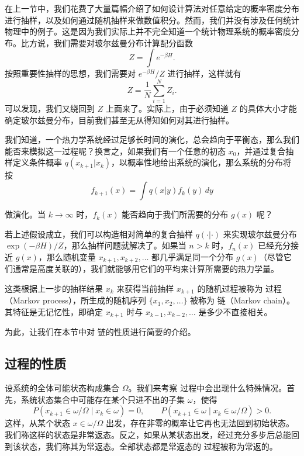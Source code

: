 在上一节中，我们花费了大量篇幅介绍了如何设计算法对任意给定的概率密度分布进行抽样，以及如何通过随机抽样来做数值积分。然而，我们并没有涉及任何统计物理中的例子。这是因为我们实际上并不完全知道一个统计物理系统的概率密度分布。比方说，我们需要对玻尔兹曼分布计算配分函数
\begin{equation}
 Z=\int e^{-\beta H}.
\tag{7.2.1}
\end{equation}
按照重要性抽样的思想，我们需要对 $e^{-\beta H}/Z$ 进行抽样，这样就有
\begin{equation}
 Z=\frac1N\sum_{i=1}^{N}Z_i.
\tag{7.2.2}
\end{equation}
可以发现，我们又绕回到 $Z$ 上面来了。实际上，由于必须知道 $Z$ 的具体大小才能确定玻尔兹曼分布，目前我们甚至无从得知如何对其进行抽样。

我们知道，一个热力学系统经过足够长时间的演化，总会趋向于平衡态，那么我们能否来模拟这一过程呢？换言之，如果我们有一个任意的初态 $x_0$，并通过复合抽样定义条件概率 $q(x_{k+1}|x_k)$，以概率性地给出系统的演化，那么系统的分布将按
\begin{equation}
 f_{k+1}(x)=\int q(x|y)f_k(y)\,dy
\tag{7.2.3}
\end{equation}

做演化。当 $k\to\infty$ 时，$f_k(x)$ 能否趋向于我们所需要的分布 $g(x)$ 呢？

若上述假设成立，我们可以构造相对简单的复合抽样 $q(\cdot|\cdot)$ 来实现玻尔兹曼分布 $\exp(-\beta H)/Z$，那么抽样问题就解决了。如果当 $n>k$ 时，$f_n(x)$ 已经充分接近 $g(x)$，那么随机变量 $x_{k+1},x_{k+2},\ldots$ 都几乎满足同一个分布 $g(x)$（尽管它们通常是高度关联的），我们就能够用它们的平均来计算所需要的热力学量。

这类根据上一步的抽样结果 $x_k$ 来获得当前抽样 $x_{k+1}$ 的随机过程被称为  过程（Markov process），所生成的随机序列 $\{x_1,x_2,\ldots\}$ 被称为  链（Markov chain）。其特征是无记忆性，即确定 $x_{k+1}$ 时与 $x_{k-1},x_{k-2},\ldots$ 是多少不直接相关。

为此，让我们在本节中对  链的性质进行简要的介绍。

\subsection{ 过程的性质}

设系统的全体可能状态构成集合 $\Omega$。我们来考察  过程中会出现什么特殊情况。首先，系统状态集合中可能存在某个只进不出的子集 $\omega$，使得
\begin{equation}
 P(x_{k+1}\in\omega/\Omega\mid x_k\in\omega)=0,\qquad
 P(x_{k+1}\in\omega\mid x_k\in\omega/\Omega)>0.
\tag{7.2.4}
\end{equation}
这样，从某个状态 $x\in\omega/\Omega$ 出发，存在非零的概率让它再也无法回到初始状态。我们称这样的状态是非常返态。反之，如果从某状态出发，经过充分多步后总能回到该状态，我们称其为常返态。全部状态都是常返态的  过程被称为常返的。

